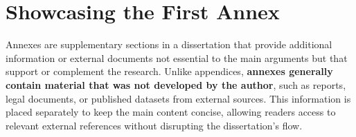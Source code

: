 
\chapter{Showcasing the First Annex}
Annexes are supplementary sections in a dissertation that provide additional information or external documents not essential to the main arguments but that support or complement the research. Unlike appendices, \textbf{annexes generally contain material that was not developed by the author}, such as reports, legal documents, or published datasets from external sources. This information is placed separately to keep the main content concise, allowing readers access to relevant external references without disrupting the dissertation's flow.